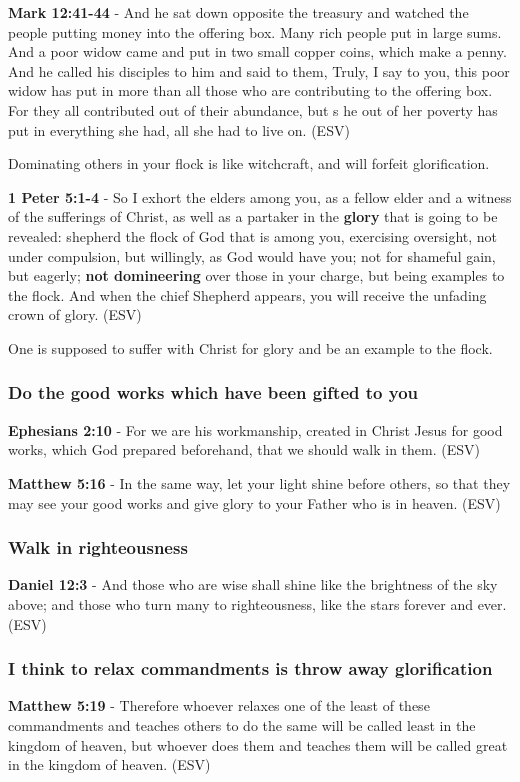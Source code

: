 \documentclass[11pt]{article}
\begin{document}
\textbf{Mark 12:41-44} - And he sat down opposite the treasury and watched the people putting money into the offering box. Many rich people put in large sums. And a poor widow came and put in two small copper coins, which make a penny. And he called his disciples to him and said to them, Truly, I say to you, this poor widow has put in more than all those who are contributing to the offering box. For they all contributed out of their abundance, but s he out of her poverty has put in everything she had, all she had to live on. (ESV)

Dominating others in your flock is like witchcraft, and will forfeit glorification.

\textbf{1 Peter 5:1-4} - So I exhort the elders among you, as a fellow elder and a witness of the sufferings of Christ, as well as a partaker in the \textbf{glory} that is going to be revealed: shepherd the flock of God that is among you, exercising oversight, not under compulsion, but willingly, as God would have you; not for shameful gain, but eagerly; \textbf{not domineering} over those in your charge, but being examples to the flock. And when the chief Shepherd appears, you will receive the unfading crown of glory. (ESV)

One is supposed to suffer with Christ for glory and be an example to the flock.

\subsubsection{Do the good works which have been gifted to you}
\label{sec:org253bf12}
\textbf{Ephesians 2:10} - For we are his workmanship, created in Christ Jesus for good works, which God prepared beforehand, that we should walk in them. (ESV)

\textbf{Matthew 5:16} - In the same way, let your light shine before others, so that they may see your good works and give glory to your Father who is in heaven. (ESV)

\subsubsection{Walk in righteousness}
\label{sec:org7a6d370}

\textbf{Daniel 12:3} - And those who are wise shall shine like the brightness of the sky above; and those who turn many to righteousness, like the stars forever and ever. (ESV)

\subsubsection{I think to relax commandments is throw away glorification}
\label{sec:org828ae58}
\textbf{Matthew 5:19} - Therefore whoever relaxes one of the least of these commandments and teaches others to do the same will be called least in the kingdom of heaven, but whoever does them and teaches them will be called great in the kingdom of heaven. (ESV)
\end{document}
